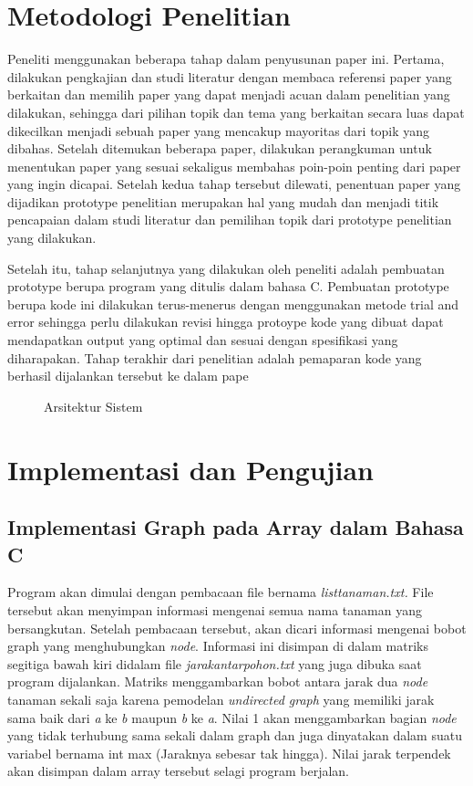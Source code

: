 \documentclass[conference]{IEEEtran}
\begin{document}
\section{Metodologi Penelitian}
Peneliti menggunakan beberapa tahap dalam penyusunan
paper ini. Pertama, dilakukan pengkajian dan studi literatur
dengan membaca referensi paper yang berkaitan dan memilih
paper yang dapat menjadi acuan dalam penelitian yang dilakukan, sehingga dari pilihan topik dan tema yang berkaitan
secara luas dapat dikecilkan menjadi sebuah paper yang mencakup mayoritas dari topik yang dibahas. Setelah ditemukan
beberapa paper, dilakukan perangkuman untuk menentukan
paper yang sesuai sekaligus membahas poin-poin penting
dari paper yang ingin dicapai. Setelah kedua tahap tersebut
dilewati, penentuan paper yang dijadikan prototype penelitian
merupakan hal yang mudah dan menjadi titik pencapaian
dalam studi literatur dan pemilihan topik dari prototype penelitian yang dilakukan.

Setelah itu, tahap selanjutnya yang dilakukan oleh peneliti
adalah pembuatan prototype berupa program yang ditulis
dalam bahasa C. Pembuatan prototype berupa kode ini dilakukan terus-menerus dengan menggunakan metode trial and
error sehingga perlu dilakukan revisi hingga protoype kode
yang dibuat dapat mendapatkan output yang optimal dan
sesuai dengan spesifikasi yang diharapakan. Tahap terakhir
dari penelitian adalah pemaparan kode yang berhasil dijalankan tersebut ke dalam pape

\begin{figure}[htbp]
    \centering
    \scalebox{0.7}{}
    \caption{Arsitektur Sistem}
\end{figure}

\section{Implementasi dan Pengujian}

\subsection{Implementasi Graph pada Array dalam Bahasa C}
Program akan dimulai dengan pembacaan file bernama
\emph{listtanaman.txt.} File tersebut akan menyimpan informasi mengenai semua nama tanaman yang bersangkutan. Setelah pembacaan tersebut, akan dicari informasi mengenai bobot graph
yang menghubungkan \emph{node}. Informasi ini disimpan di dalam
matriks segitiga bawah kiri didalam file \emph{jarakantarpohon.txt}
yang juga dibuka saat program dijalankan. Matriks menggambarkan bobot antara jarak dua \emph{node} tanaman sekali saja karena
pemodelan \emph{undirected graph} yang memiliki jarak sama baik
dari \emph{a} ke \emph{b} maupun \emph{b} ke \emph{a}. Nilai 1 akan menggambarkan
bagian \emph{node} yang tidak terhubung sama sekali dalam graph
dan juga dinyatakan dalam suatu variabel bernama int max
(Jaraknya sebesar tak hingga). Nilai jarak terpendek akan
disimpan dalam array tersebut selagi program berjalan.
\end{document}

